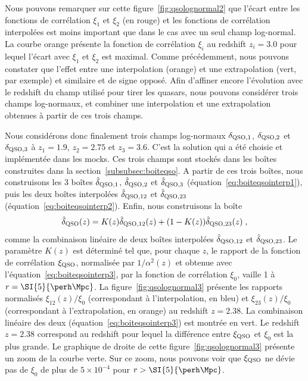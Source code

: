 Nous pouvons remarquer sur cette figure~\ref{fig:qsolognormal2} que l'écart entre les fonctions de corrélation $\xi_1$ et $\xi_2$ (en rouge) et les fonctions de corrélation interpolées est moins important que dans le cas avec un seul champ log-normal. La courbe orange présente la fonction de corrélation $\xi_i$ au redshift $z_i = \num{3.0}$ pour lequel l'écart avec $\xi_1$ et $\xi_2$ est maximal.
Comme précédemment, nous pouvons constater que l'effet entre une interpolation (orange) et une extrapolation (vert, par exemple) et similaire et de signe opposé. Afin d'affiner encore l'évolution avec le redshift du champ utilisé pour tirer les quasars, nous pouvons considérer trois champs log-normaux, et combiner une interpolation et une extrapolation obtenues à partir de ces trois champs.

Nous considérons donc finalement trois champs log-normaux $\delta_{\textsc{QSO},1}$, $\delta_{\textsc{QSO},2}$ et $\delta_{\textsc{QSO},3}$  à $z_1 = \num{1.9}$,  $z_2 = \num{2.75}$  et $z_3 = \num{3.6}$. C'est la solution qui a été choisie et implémentée dans les mocks. Ces trois champs sont stockés dans les boîtes construites dans la section~\ref{subsubsec:boiteqso}. A partir de ces trois boîtes, nous construisons les 3 boîtes $\hat \delta_{\textsc{QSO},1}$, $\hat \delta_{\textsc{QSO},2}$ et $\hat \delta_{\textsc{QSO},3}$ (équation~\ref{eq:boiteqsointerp1}), puis les deux boîtes interpolées $\hat \delta_{\textsc{QSO},12}$ et $\hat \delta_{\textsc{QSO},23}$ (équation~\ref{eq:boiteqsointerp2}). Enfin, nous construisons la boîte
\begin{equation}
  \label{eq:boiteqsointerp3}
  \hat \delta_{\textsc{QSO}}(z) = K(z) \hat \delta_{\textsc{QSO}, 12}(z) + (1 - K(z)) \hat \delta_{\textsc{QSO}, 23}(z) \; ,
\end{equation}
comme la combinaison linéaire de deux boîtes interpolées $\hat \delta_{\textsc{QSO},12}$ et $\hat \delta_{\textsc{QSO},23}$. Le paramètre $K(z)$ est déterminé tel que, pour chaque $z$, le rapport de la fonction de corrélation $\xi_{\textsc{QSO}}$, normalisée par $1/\alpha^2(z)$ et obtenue avec l'équation~\ref{eq:boiteqsointerp3}, par la fonction de corrélation $\xi_0$, vaille 1 à $r = \SI{5}{\perh\Mpc}$. La figure~\ref{fig:qsolognormal3} présente les rapports normalisés $\xi_{12}(z) / \xi_0$ (correspondant à l'interpolation, en bleu) et $\xi_{23}(z) / \xi_0$ (correspondant à l'extrapolation, en orange) au redshift $z = \num{2.38}$. La combinaison linéaire des deux (équation~\ref{eq:boiteqsointerp3}) est montrée en vert. Le redshift $z = \num{2.38}$ correspond au redshift pour lequel la différence entre $\xi_{\textsc{QSO}}$ et $\xi_0$ est la plus grande. Le graphique de droite de cette figure~\ref{fig:qsolognormal3} présente un zoom de la courbe verte. Sur ce zoom, nous pouvons voir que $\xi_{\textsc{QSO}}$ ne dévie pas de $\xi_0$ de plus de $5\times 10^{-4}$ pour $r > \SI{5}{\perh\Mpc}$.
